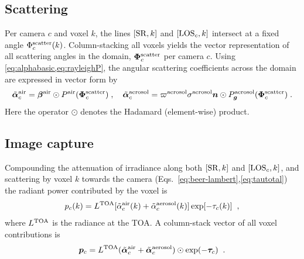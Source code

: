 \documentclass[10pt,letterpaper]{article}
\newcommand{\vect}[1]{\bm{#1}}
\begin{document}

\subsection{Scattering}
\label{sec:scattering}

Per camera $c$ and voxel $k$, the lines $[{\rm SR},k]$ and $[{\rm
  LOS}_c,k]$ intersect at a fixed angle $\Phi^{\rm scatter}_c(k)$.
Column-stacking all voxels yields the vector representation of all
scattering angles in the domain, $\vect{\Phi}^{\rm scatter}_c$ per
camera $c$.
Using \cref{eq:alphabasic,eq:rayleighP}, the angular scattering
coefficients across the domain are expressed in vector form by
\begin{equation}
  \tilde{\vect{\alpha}}^{\rm air}_c =
  \vect{\beta}^{\rm air} \odot P^{\rm air}(\vect{\Phi}^{\rm scatter}_c)\;,
  \quad
  \tilde{\vect{\alpha}}^{\rm aerosol}_c =
  \varpi^{\rm aerosol} \sigma^{\rm aerosol}
  {\bm n} \odot P^{\rm aerosol}_{\bm g}(\vect{\Phi}^{\rm scatter}_c) \;.
  \label{eq:alpha_matrix}
\end{equation}
Here the operator $\odot$ denotes the Hadamard (element-wise) product.


\subsection{Image capture}
\label{sec:captured-image}

Compounding the attenuation of irradiance along both $[{\rm SR},k]$
and $[{\rm LOS}_c,k]$, and scattering by voxel $k$ towards the camera
(Eqs.~\ref{eq:beer-lambert},\ref{eq:tautotal}) the radiant power
contributed by the voxel is
\begin{equation}
  p_c(k)= L^{\rm TOA}
  [\tilde{\alpha}^{\rm air}_c(k) + \tilde{\alpha}^{\rm aerosol}_c(k)]
  \exp[-\tau_c(k)]
  \;\;,
  \label{eq:ick}
\end{equation}
where $L^{\rm TOA}$ is the radiance at the TOA. A column-stack vector
of all voxel contributions is
\begin{equation}
  {\bm p}_c= L^{\rm TOA}
  (\tilde{\vect{\alpha}}^{\rm air}_c + \tilde{\vect{\alpha}}^{\rm aerosol}_c)
  \odot \exp(-\vect{\tau}_c)
  \;\;.
  \label{eq:pc}
\end{equation}
\end{document}
